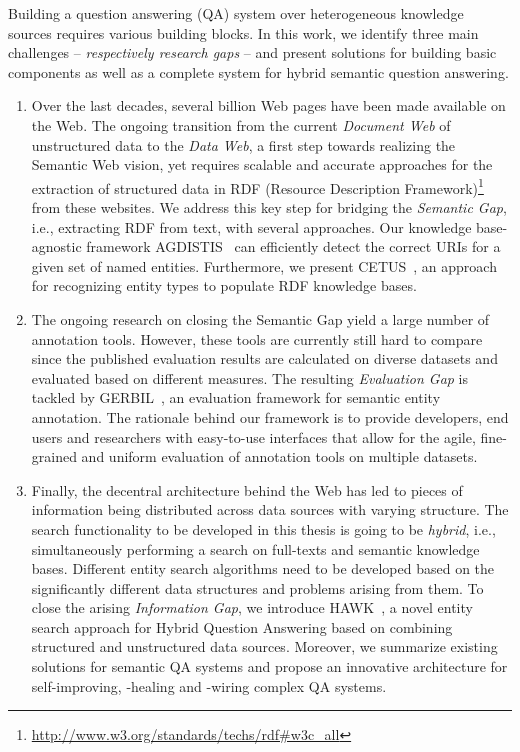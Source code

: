 Building a question answering (QA) system over heterogeneous knowledge sources requires various building blocks.
In this work, we identify three main challenges -- \emph{respectively research gaps} -- and present solutions for building basic components as well as a complete system for hybrid semantic question answering.
\begin{enumerate}
\item 
Over the last decades, several billion Web pages have been made available on the Web. 
The ongoing transition from the current \emph{Document Web} of unstructured data to the \emph{Data Web}, a first step towards realizing the Semantic Web vision, yet requires scalable and accurate approaches for the extraction of structured data in RDF (Resource Description Framework)\footnote{\url{http://www.w3.org/standards/techs/rdf\#w3c_all}} from these websites.
We address this key step for bridging the \emph{Semantic Gap}, i.e., extracting RDF from text,  with several approaches.
Our knowledge base-agnostic framework AGDISTIS~\cite{agdistis_iswc} can efficiently detect the correct URIs for a given set of named entities.
Furthermore, we present CETUS~\cite{CETUS_2015}, an approach for recognizing entity types to populate RDF knowledge bases. 
\item 
The ongoing research on closing the Semantic Gap yield a large number of annotation tools.
However, these tools are currently still hard to compare since the published evaluation results are calculated on diverse datasets and evaluated based on different measures.
The resulting \emph{Evaluation Gap} is tackled by GERBIL~\cite{GERBIL}, an evaluation framework for semantic entity annotation. The rationale behind our framework is to provide developers, end users and researchers with easy-to-use interfaces that allow for the agile, fine-grained and uniform evaluation of annotation tools on multiple datasets.
\item 
Finally, the decentral architecture behind the Web has led to pieces of information being distributed across data sources with varying structure. 
The search functionality to be developed in this thesis is going to be \emph{hybrid}, i.e., simultaneously performing a search on full-texts and semantic knowledge bases.
Different entity search algorithms need to be developed based on the significantly different data structures and problems arising from them. 
To close the arising \emph{Information Gap}, we introduce HAWK~\cite{hawk_2015}, a novel entity search approach for Hybrid Question Answering based on combining structured and unstructured data sources.
Moreover, we summarize existing solutions for semantic QA systems and propose an innovative architecture for self-improving, -healing and -wiring complex QA systems.
\end{enumerate}

